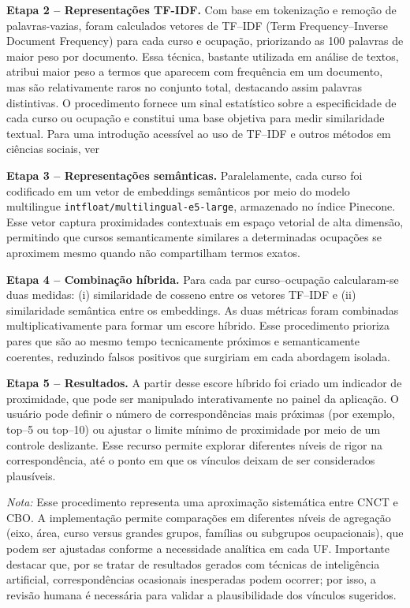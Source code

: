 \textbf{Etapa 2 – Representações TF-IDF.}
Com base em tokenização e remoção de palavras-vazias, foram calculados vetores de TF–IDF (Term Frequency–Inverse Document Frequency) para cada curso e ocupação, priorizando as 100 palavras de maior peso por documento. Essa técnica, bastante utilizada em análise de textos, atribui maior peso a termos que aparecem com frequência em um documento, mas são relativamente raros no conjunto total, destacando assim palavras distintivas. O procedimento fornece um sinal estatístico sobre a especificidade de cada curso ou ocupação e constitui uma base objetiva para medir similaridade textual. Para uma introdução acessível ao uso de TF–IDF e outros métodos em ciências sociais, ver \parencite{grimmer_roberts}

\textbf{Etapa 3 – Representações semânticas.}
Paralelamente, cada curso foi codificado em um vetor de embeddings semânticos por meio do modelo multilingue \texttt{intfloat/multilingual-e5-large}, armazenado no índice Pinecone. Esse vetor captura proximidades contextuais em espaço vetorial de alta dimensão, permitindo que cursos semanticamente similares a determinadas ocupações se aproximem mesmo quando não compartilham termos exatos.

\textbf{Etapa 4 – Combinação híbrida.}
Para cada par curso–ocupação calcularam-se duas medidas: (i) similaridade de cosseno entre os vetores TF–IDF e (ii) similaridade semântica entre os embeddings. As duas métricas foram combinadas multiplicativamente para formar um escore híbrido. Esse procedimento prioriza pares que são ao mesmo tempo tecnicamente próximos e semanticamente coerentes, reduzindo falsos positivos que surgiriam em cada abordagem isolada.

\textbf{Etapa 5 – Resultados.}
A partir desse escore híbrido foi criado um indicador de proximidade, que pode ser manipulado interativamente no painel da aplicação. O usuário pode definir o número de correspondências mais próximas (por exemplo, top–5 ou top–10) ou ajustar o limite mínimo de proximidade por meio de um controle deslizante. Esse recurso permite explorar diferentes níveis de rigor na correspondência, até o ponto em que os vínculos deixam de ser considerados plausíveis.


\textit{Nota:} Esse procedimento representa uma aproximação sistemática entre CNCT e CBO. A implementação permite comparações em diferentes níveis de agregação (eixo, área, curso versus grandes grupos, famílias ou subgrupos ocupacionais), que podem ser ajustadas conforme a necessidade analítica em cada UF. Importante destacar que, por se tratar de resultados gerados com técnicas de inteligência artificial, correspondências ocasionais inesperadas podem ocorrer; por isso, a revisão humana é necessária para validar a plausibilidade dos vínculos sugeridos.

